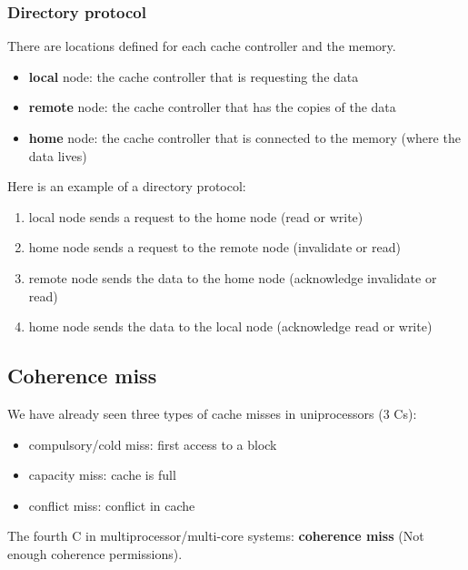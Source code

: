 \documentclass[letterpaper,12pt]{article}
\begin{document}
\subsubsection{Directory protocol}
There are locations defined for each cache controller and the memory.\begin{itemize}
    \item \textbf{local} node: the cache controller that is requesting the data
    \item \textbf{remote} node: the cache controller that has the copies of the data
    \item \textbf{home} node: the cache controller that is connected to the memory (where the data lives)
\end{itemize}

Here is an example of a directory protocol:\begin{enumerate}
    \item local node sends a request to the home node (read or write)
    \item home node sends a request to the remote node (invalidate or read)
    \item remote node sends the data to the home node (acknowledge invalidate or read)
    \item home node sends the data to the local node (acknowledge read or write)
\end{enumerate}

\subsection{Coherence miss}
We have already seen three types of cache misses in uniprocessors (3 Cs): \begin{itemize}
    \item compulsory/cold miss: first access to a block
    \item capacity miss: cache is full
    \item conflict miss: conflict in cache
\end{itemize}
The fourth C in multiprocessor/multi-core systems: \textbf{coherence miss} (Not enough coherence permissions).
\end{document}
